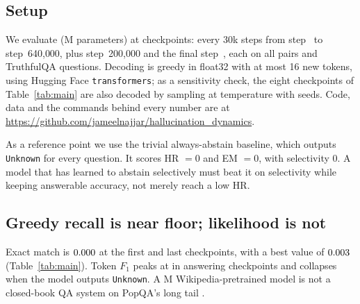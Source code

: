 \documentclass[11pt]{article}
\begin{document}
\subsection{Setup}
\label{sec:setup}

We evaluate \texttt{\resModelName{}} (\resModelParams{}M parameters) at \resNumCheckpoints{} checkpoints: every 30k steps from step~\resFirstStep{} to step~640{,}000, plus step~200{,}000 and the final step~\resLastStep{}, each on all \resNumAnswerable{} pairs and \resNumAdversarial{} TruthfulQA questions. Decoding is greedy in float32 with at most 16 new tokens, using Hugging Face \texttt{transformers}; as a sensitivity check, the eight checkpoints of Table~\ref{tab:main} are also decoded by sampling at temperature \resSampTemperature{} with \resSampNumSeeds{} seeds. Code, data and the commands behind every number are at \url{https://github.com/jameelnajjar/hallucination_dynamics}.

As a reference point we use the trivial always-abstain baseline, which outputs \texttt{Unknown} for every question. It scores HR $=0$ and EM $=0$, with selectivity $0$. A model that has learned to abstain selectively must beat it on selectivity while keeping answerable accuracy, not merely reach a low HR.

\begin{table}[t]
\centering
\small

\caption{Eight representative checkpoints: onset (10k), abstention onset (70k), asserting (130k, 200k), mixed (160k, 310k), collapsed abstention (400k), and final. EM, $F_1$, gold-answer NLL (nats) and abstention rate (AR) on answerable PopQA; broad hallucination rate (HR), entity-hallucination rate (EHR), question-echo rate and AR on the unanswerable twins; ECE and mean token entropy $H$ on answerable questions. HR $=$ EHR $+$ Echo up to rounding. All \resNumCheckpoints{} checkpoints are in Appendix~\ref{app:full}.}
\label{tab:main}
\end{table}

\subsection{Greedy recall is near floor; likelihood is not}

Exact match is $0.000{}$ at the first and last checkpoints, with a best value of $0.003{}$ (Table~\ref{tab:main}). Token $F_1$ peaks at \resFOneBest{} in answering checkpoints and collapses when the model outputs \texttt{Unknown}. A \resModelParams{}M Wikipedia-pretrained model is not a closed-book QA system on PopQA's long tail \citep{mallen2023popqa,gottesman2025lment}.
\end{document}
